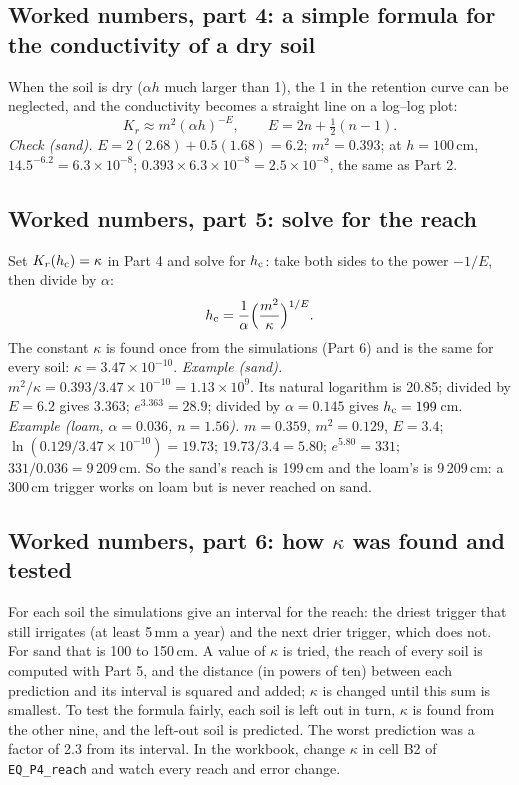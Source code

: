 \subsection{Worked numbers, part 4: a simple formula for the conductivity of a dry soil}
When the soil is dry ($\alpha h$ much larger than 1), the 1 in the retention curve can be neglected, and the conductivity becomes a straight line on a log--log plot:
\[K_r\approx m^2(\alpha h)^{-E},\qquad E=2n+\tfrac12(n-1).\]
\emph{Check (sand).} $E=2(2.68)+0.5(1.68)=6.2$; $m^2=0.393$; at $h=100$\,cm, $14.5^{-6.2}=6.3\times10^{-8}$; $0.393\times6.3\times10^{-8}=2.5\times10^{-8}$, the same as Part 2.


\subsection{Worked numbers, part 5: solve for the reach}
Set $K_r(h_{\mathrm{c}})=\kappa$ in Part 4 and solve for $h_{\mathrm{c}}$: take both sides to the power $-1/E$, then divide by $\alpha$:
\[h_{\mathrm{c}}=\frac1\alpha\Bigl(\frac{m^2}{\kappa}\Bigr)^{1/E}.\]
The constant $\kappa$ is found once from the simulations (Part 6) and is the same for every soil: $\kappa=3.47\times10^{-10}$.
\emph{Example (sand).} $m^2/\kappa=0.393/3.47\times10^{-10}=1.13\times10^{9}$. Its natural logarithm is 20.85; divided by $E=6.2$ gives 3.363; $e^{3.363}=28.9$; divided by $\alpha=0.145$ gives $h_{\mathrm{c}}=199$\,cm.
\emph{Example (loam, $\alpha=0.036$, $n=1.56$).} $m=0.359$, $m^2=0.129$, $E=3.4$; $\ln(0.129/3.47\times10^{-10})=19.73$; $19.73/3.4=5.80$; $e^{5.80}=331$; $331/0.036=9\,209$\,cm.
So the sand's reach is 199\,cm and the loam's is 9\,209\,cm: a 300\,cm trigger works on loam but is never reached on sand.


\subsection{Worked numbers, part 6: how $\kappa$ was found and tested}
For each soil the simulations give an interval for the reach: the driest trigger that still irrigates (at least 5\,mm a year) and the next drier trigger, which does not. For sand that is 100 to 150\,cm. A value of $\kappa$ is tried, the reach of every soil is computed with Part 5, and the distance (in powers of ten) between each prediction and its interval is squared and added; $\kappa$ is changed until this sum is smallest. To test the formula fairly, each soil is left out in turn, $\kappa$ is found from the other nine, and the left-out soil is predicted. The worst prediction was a factor of 2.3 from its interval. In the workbook, change $\kappa$ in cell B2 of \texttt{EQ\_P4\_reach} and watch every reach and error change.


